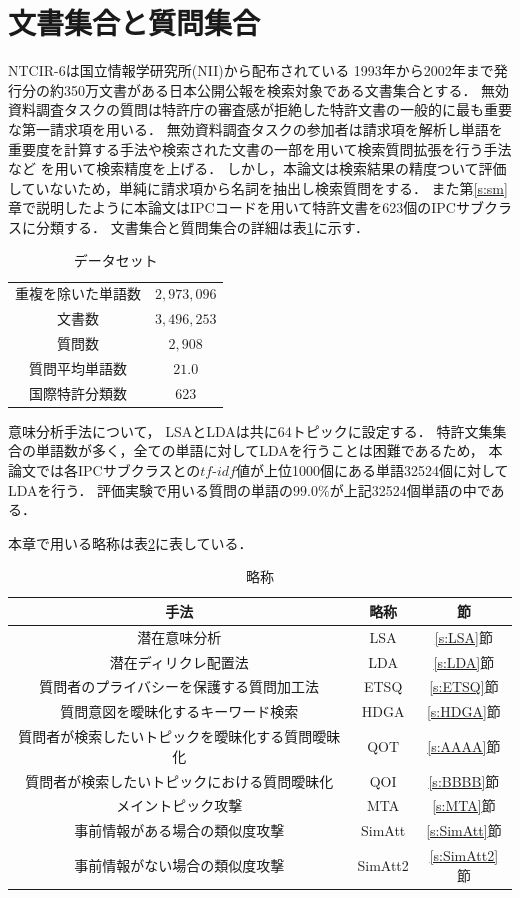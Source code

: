 \documentclass[master]{suribt}
\theoremstyle{definition}
\begin{document}
 \section{文書集合と質問集合}
 NTCIR-6は国立情報学研究所(NII)から配布されている
 1993年から2002年まで発行分の約350万文書がある日本公開公報を検索対象である文書集合とする．
 無効資料調査タスクの質問は特許庁の審査感が拒絶した特許文書の一般的に最も重要な第一請求項を用いる．
 無効資料調査タスクの参加者は請求項を解析し単語を重要度を計算する手法や検索された文書の一部を用いて検索質問拡張を行う手法など
 を用いて検索精度を上げる．
 しかし，本論文は検索結果の精度ついて評価していないため，単純に請求項から名詞を抽出し検索質問をする．
 また第\ref{s:sm}章で説明したように本論文はIPCコードを用いて特許文書を623個のIPCサブクラスに分類する．
 文書集合と質問集合の詳細は表\ref{tab:data}に示す． 

 \begin{table}[!hbp]
 \center
 \begin{tabular}{|c|c|}
 \hline
 重複を除いた単語数 & $2,973,096$  \\
 文書数 & $3,496,253$ \\
 質問数 & $2,908$ \\
 質問平均単語数 & $21.0$ \\
 国際特許分類数 & 623 \\
 \hline
 \end{tabular}
 \caption{データセット}
 \label{tab:data}
 \end{table}

 意味分析手法について，
 LSAとLDAは共に64トピックに設定する．
 特許文集集合の単語数が多く，全ての単語に対してLDAを行うことは困難であるため，
 本論文では各IPCサブクラスとの$tf\text{-}idf$値が上位1000個にある単語32524個に対してLDAを行う．
 評価実験で用いる質問の単語の$99.0\%$が上記32524個単語の中である．
 
 本章で用いる略称は表\ref{tab:abbr}に表している．

 \begin{table}[!hbp]
 \center
 \begin{tabular}{|c|c|c|}
 \hline
 手法 & 略称  & 節\\
 \hline
 潜在意味分析 & LSA & \ref{s:LSA}節 \\
 潜在ディリクレ配置法 & LDA & \ref{s:LDA}節 \\
 質問者のプライバシーを保護する質問加工法 & ETSQ & \ref{s:ETSQ}節 \\
 質問意図を曖昧化するキーワード検索 & HDGA & \ref{s:HDGA}節 \\
 質問者が検索したいトピックを曖昧化する質問曖昧化 & QOT & \ref{s:AAAA}節 \\
 質問者が検索したいトピックにおける質問曖昧化 & QOI & \ref{s:BBBB}節 \\
 メイントピック攻撃 & MTA & \ref{s:MTA}節 \\
 事前情報がある場合の類似度攻撃 & SimAtt & \ref{s:SimAtt}節 \\
 事前情報がない場合の類似度攻撃 & SimAtt2 & \ref{s:SimAtt2}節 \\
 \hline
 \end{tabular}
 \caption{略称}
 \label{tab:abbr}
 \end{table}
\end{document}
